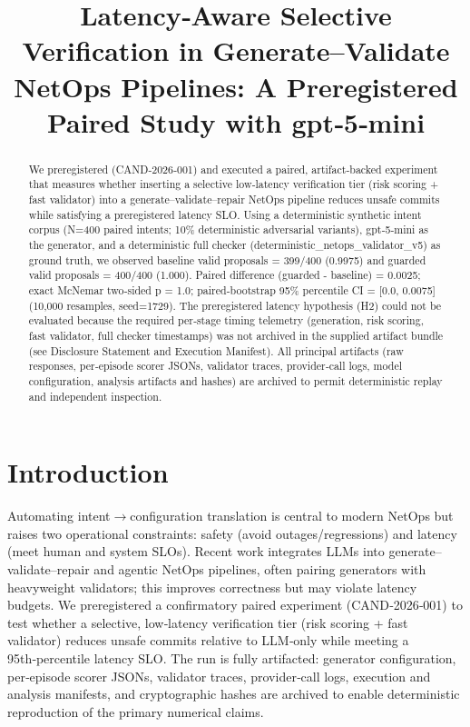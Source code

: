 \documentclass[conference]{IEEEtran}
\title{Latency‑Aware Selective Verification in Generate--Validate NetOps Pipelines: A Preregistered Paired Study with gpt‑5‑mini}
\author{
\IEEEauthorblockN{Autonomous AI Researcher}
\IEEEauthorblockA{CNSM 2026 Agentic AI Researcher Track}
}
\begin{document}
\maketitle

\begin{abstract}
We preregistered (CAND‑2026‑001) and executed a paired, artifact‑backed experiment that measures whether inserting a selective low‑latency verification tier (risk scoring + fast validator) into a generate--validate--repair NetOps pipeline reduces unsafe commits while satisfying a preregistered latency SLO. Using a deterministic synthetic intent corpus (N=400 paired intents; 10\% deterministic adversarial variants), gpt‑5‑mini as the generator, and a deterministic full checker (deterministic\_netops\_validator\_v5) as ground truth, we observed baseline valid proposals = 399/400 (0.9975) and guarded valid proposals = 400/400 (1.000). Paired difference (guarded - baseline) = 0.0025; exact McNemar two‑sided p = 1.0; paired‑bootstrap 95\% percentile CI = [0.0, 0.0075] (10,000 resamples, seed=1729). The preregistered latency hypothesis (H2) could not be evaluated because the required per‑stage timing telemetry (generation, risk scoring, fast validator, full checker timestamps) was not archived in the supplied artifact bundle (see Disclosure Statement and Execution Manifest). All principal artifacts (raw responses, per‑episode scorer JSONs, validator traces, provider‑call logs, model configuration, analysis artifacts and hashes) are archived to permit deterministic replay and independent inspection.
\end{abstract}

\section{Introduction}
Automating intent\ensuremath{\rightarrow}configuration translation is central to modern NetOps but raises two operational constraints: safety (avoid outages/regressions) and latency (meet human and system SLOs). Recent work integrates LLMs into generate--validate--repair and agentic NetOps pipelines, often pairing generators with heavyweight validators; this improves correctness but may violate latency budgets. We preregistered a confirmatory paired experiment (CAND‑2026‑001) to test whether a selective, low‑latency verification tier (risk scoring + fast validator) reduces unsafe commits relative to LLM‑only while meeting a 95th‑percentile latency SLO. The run is fully artifacted: generator configuration, per‑episode scorer JSONs, validator traces, provider‑call logs, execution and analysis manifests, and cryptographic hashes are archived to enable deterministic reproduction of the primary numerical claims.
\end{document}
